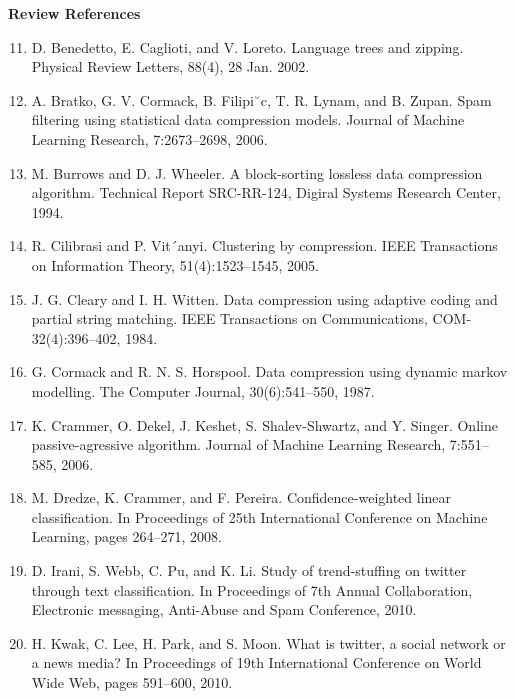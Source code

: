 \documentclass{article}
\begin{document}




\textbf{Review References}

\begin{enumerate}
	\setcounter{enumi}{10}
	
	\item D. Benedetto, E. Caglioti, and V. Loreto. Language
	trees and zipping. Physical Review Letters, 88(4), 28
	Jan. 2002.
	
	\item A. Bratko, G. V. Cormack, B. Filipi˘c, T. R. Lynam,
	and B. Zupan. Spam filtering using statistical data
	compression models. Journal of Machine Learning
	Research, 7:2673–2698, 2006.
	
	\item M. Burrows and D. J. Wheeler. A block-sorting
	lossless data compression algorithm. Technical Report
	SRC-RR-124, Digiral Systems Research Center, 1994.
	
	\item R. Cilibrasi and P. Vit´anyi. Clustering by
	compression. IEEE Transactions on Information
	Theory, 51(4):1523–1545, 2005.
	
	\item J. G. Cleary and I. H. Witten. Data compression using
	adaptive coding and partial string matching. IEEE
	Transactions on Communications,
	COM-32(4):396–402, 1984.
	
	\item G. Cormack and R. N. S. Horspool. Data compression
	using dynamic markov modelling. The Computer
	Journal, 30(6):541–550, 1987.
	
	\item K. Crammer, O. Dekel, J. Keshet, S. Shalev-Shwartz,
	and Y. Singer. Online passive-agressive algorithm.
	Journal of Machine Learning Research, 7:551–585,
	2006.

	\item M. Dredze, K. Crammer, and F. Pereira.
	Confidence-weighted linear classification. In
	Proceedings of 25th International Conference on
	Machine Learning, pages 264–271, 2008.

	\item D. Irani, S. Webb, C. Pu, and K. Li. Study of
	trend-stuffing on twitter through text classification. In
	Proceedings of 7th Annual Collaboration, Electronic
	messaging, Anti-Abuse and Spam Conference, 2010.

	\item H. Kwak, C. Lee, H. Park, and S. Moon. What is
	twitter, a social network or a news media? In
	Proceedings of 19th International Conference on
	World Wide Web, pages 591–600, 2010.


\end{enumerate}
\end{document}

